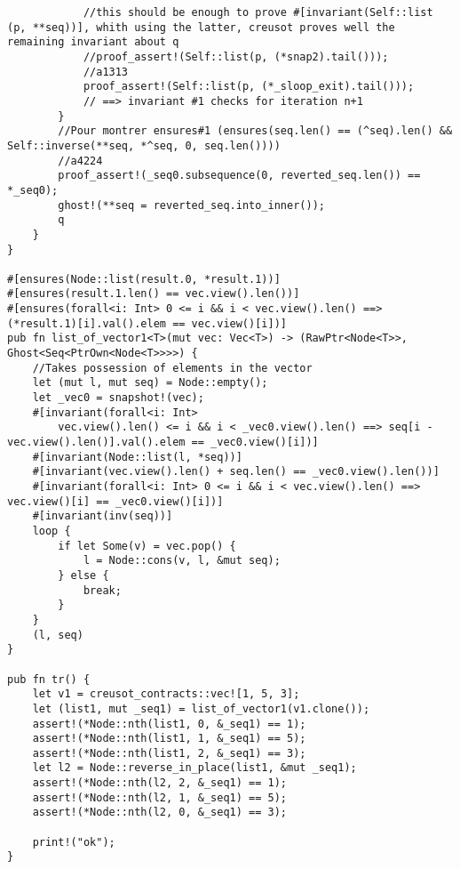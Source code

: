 \begin{verbatim}
            //this should be enough to prove #[invariant(Self::list (p, **seq))], whith using the latter, creusot proves well the remaining invariant about q
            //proof_assert!(Self::list(p, (*snap2).tail()));
            //a1313
            proof_assert!(Self::list(p, (*_sloop_exit).tail()));
            // ==> invariant #1 checks for iteration n+1
        }
        //Pour montrer ensures#1 (ensures(seq.len() == (^seq).len() && Self::inverse(**seq, *^seq, 0, seq.len())))
        //a4224
        proof_assert!(_seq0.subsequence(0, reverted_seq.len()) == *_seq0);
        ghost!(**seq = reverted_seq.into_inner());
        q
    }
}

#[ensures(Node::list(result.0, *result.1))]
#[ensures(result.1.len() == vec.view().len())]
#[ensures(forall<i: Int> 0 <= i && i < vec.view().len() ==> (*result.1)[i].val().elem == vec.view()[i])]
pub fn list_of_vector1<T>(mut vec: Vec<T>) -> (RawPtr<Node<T>>, Ghost<Seq<PtrOwn<Node<T>>>>) {
    //Takes possession of elements in the vector
    let (mut l, mut seq) = Node::empty();
    let _vec0 = snapshot!(vec);
    #[invariant(forall<i: Int>
        vec.view().len() <= i && i < _vec0.view().len() ==> seq[i - vec.view().len()].val().elem == _vec0.view()[i])]
    #[invariant(Node::list(l, *seq))]
    #[invariant(vec.view().len() + seq.len() == _vec0.view().len())]
    #[invariant(forall<i: Int> 0 <= i && i < vec.view().len() ==> vec.view()[i] == _vec0.view()[i])]
    #[invariant(inv(seq))]
    loop {
        if let Some(v) = vec.pop() {
            l = Node::cons(v, l, &mut seq);
        } else {
            break;
        }
    }
    (l, seq)
}

pub fn tr() {
    let v1 = creusot_contracts::vec![1, 5, 3];
    let (list1, mut _seq1) = list_of_vector1(v1.clone());
    assert!(*Node::nth(list1, 0, &_seq1) == 1);
    assert!(*Node::nth(list1, 1, &_seq1) == 5);
    assert!(*Node::nth(list1, 2, &_seq1) == 3);
    let l2 = Node::reverse_in_place(list1, &mut _seq1);
    assert!(*Node::nth(l2, 2, &_seq1) == 1);
    assert!(*Node::nth(l2, 1, &_seq1) == 5);
    assert!(*Node::nth(l2, 0, &_seq1) == 3);

    print!("ok");
}
\end{verbatim}
